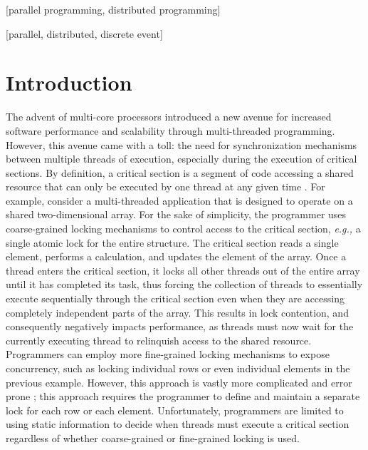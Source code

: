 \documentclass{sig-alternate}
\begin{document}
[parallel
  programming, distributed programming]

[parallel,
  distributed, discrete event]



\section{Introduction}\label{intro} 

The advent of multi-core processors introduced a new avenue for increased software
performance and scalability through multi-threaded programming.  However, this avenue came
with a toll: the need for synchronization mechanisms between multiple threads of
execution, especially during the execution of critical sections.  By definition, a
critical section is a segment of code accessing a shared resource that can only be
executed by one thread at any given time \cite{os_concepts}.  For example, consider a
multi-threaded application that is designed to operate on a shared two-dimensional array.
For the sake of simplicity, the programmer uses coarse-grained locking mechanisms to
control access to the critical section, \emph{e.g.,} a single atomic lock for the entire
structure.  The critical section reads a single element, performs a calculation, and
updates the element of the array.  Once a thread enters the critical section, it locks all
other threads out of the entire array until it has completed its task, thus forcing the
collection of threads to essentially execute sequentially through the critical section
even when they are accessing completely independent parts of the array.  This results in
lock contention, and consequently negatively impacts performance, as threads must now wait
for the currently executing thread to relinquish access to the shared resource.
Programmers can employ more fine-grained locking mechanisms to expose concurrency, such as
locking individual rows or even individual elements in the previous example.  However,
this approach is vastly more complicated and error prone \cite{sle_rajwar}; this approach
requires the programmer to define and maintain a separate lock for each row or each
element.  Unfortunately, programmers are limited to using static information to decide
when threads must execute a critical section regardless of whether coarse-grained or
fine-grained locking is used.
\end{document}
